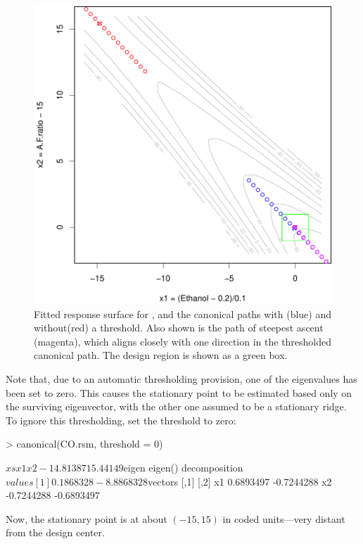 \documentclass[article,nojss]{jss}
\begin{document}
\begin{figure}
\includegraphics[width=.6\textwidth]{rsm-rising-ridge.pdf}

\caption{Fitted response surface for , and the canonical paths with (blue) and without(red) a threshold. Also shown is the path of steepest ascent (magenta), which aligns closely with one direction in the thresholded canonical path. 
The design region is shown as a green box.}\label{rising-ridge}
\end{figure}
%
Note that, due to an automatic thresholding provision, one of the eigenvalues has been
set to zero. This causes the stationary point to be estimated based only on the
surviving eigenvector, with the other one assumed to be a stationary ridge.
To ignore this thresholding, set the threshold to zero:
\begin{Schunk}
\begin{Sinput}
> canonical(CO.rsm, threshold = 0)
\end{Sinput}
\begin{Soutput}
$xs
       x1        x2 
-14.81387  15.44149 

$eigen
eigen() decomposition
$values
[1]  0.1868328 -8.8868328

$vectors
         [,1]       [,2]
x1  0.6893497 -0.7244288
x2 -0.7244288 -0.6893497
\end{Soutput}
\end{Schunk}
Now, the stationary point is at about $(-15,15)$ in coded units---very distant from the design center. 
\end{document}
